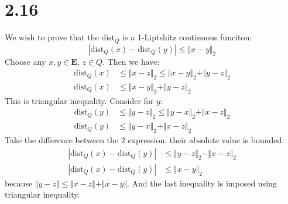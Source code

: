 \documentclass[]{article}
\begin{document}
\section*{2.16}
    We wish to prove that the $\text{dist}_Q$ is a 1-Liptshitz continuous funciton: 
    $$
        |\text{dist}_Q(x) - \text{dist}_Q(y)| \le \Vert x - y\Vert_2
    $$
    Choose any $x, y \in \mathbf{E}$, $z \in Q$. Then we have: 
    \begin{align*}\tag{2.16.1}\label{eqn:2.16.1}
        \text{dist}_Q(x) &\le \Vert x - z\Vert_2 \le \Vert x - y\Vert_2 + \Vert y - z\Vert_2
        \\
        \text{dist}_Q(x) &\le \Vert x - y\Vert_2 + \Vert y - z\Vert_2
    \end{align*}
    This is triangular inequality. Consider for $y$: 
    \begin{align*}\tag{2.16.2}\label{eqn:2.16.2}
        \text{dist}_Q(y) &\le \Vert  y - z\Vert_2 \le \Vert y - x\Vert_ 2 + \Vert  x- z\Vert_2
        \\
        \text{dist}_Q(y) & \le \Vert y - x\Vert_ 2 + \Vert  x- z\Vert_2
    \end{align*}
    Take the difference between the 2 expression, their absolute value is bounded: 
    \begin{align*}\tag{2.16.3}\label{eqn:2.16.3}
        |\text{dist}_Q(x) - \text{dist}_Q(y)| &\le \Vert y - z\Vert_2 - \Vert x - z\Vert_2
        \\
        |\text{dist}_Q(x) - \text{dist}_Q(y)| &\le \Vert x - y\Vert_2
    \end{align*}
    because $\Vert y - z\Vert \le \Vert x - z\Vert + \Vert x - y\Vert$. And the last inequality is imposed using triangular inequality. 
\end{document}
